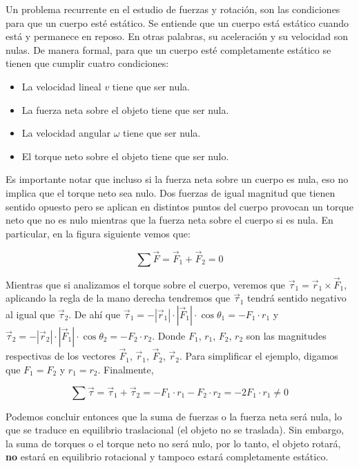 \documentclass[letterpaper]{article}
\begin{document}
Un problema recurrente en el estudio de fuerzas y rotación, son las condiciones para que un cuerpo esté estático. Se entiende que un cuerpo está estático cuando está y permanece en reposo. En otras palabras, su aceleración y su velocidad son nulas. De manera formal, para que un cuerpo esté completamente estático se tienen que cumplir cuatro condiciones:
\begin{itemize}
\item La velocidad lineal $v$ tiene que ser nula.
\item La fuerza neta sobre el objeto tiene que ser nula.
\item La velocidad angular $\omega$ tiene que ser nula.
\item El torque neto sobre el objeto tiene que ser nulo.
\end{itemize}

Es importante notar que incluso si la fuerza neta sobre un cuerpo es nula, eso no implica que el torque neto sea nulo. Dos fuerzas de igual magnitud que tienen sentido opuesto pero se aplican en distintos puntos del cuerpo provocan un torque neto que no es nulo mientras que la fuerza neta sobre el cuerpo si es nula. En particular, en la figura siguiente vemos que:

$$\sum\vec{F} = \vec{F}_1 + \vec{F}_2 = 0$$

Mientras que si analizamos el torque sobre el cuerpo, veremos que $\vec{\tau}_1 = \vec{r}_1\times\vec{F}_1$, aplicando la regla de la mano derecha tendremos que $\vec{\tau}_1$ tendrá sentido negativo al igual que $\vec{\tau}_2$. De ahí que $\vec{\tau}_1 = -|\vec{r}_1|\cdot|\vec{F}_1|\cdot\cos{\theta_1} = -F_1\cdot r_1$ y $\vec{\tau}_2 = -|\vec{r}_2|\cdot|\vec{F}_1|\cdot\cos{\theta_2} = -F_2\cdot r_2$. Donde $F_1$, $r_1$, $F_2$, $r_2$ son las magnitudes respectivas de los vectores $\vec{F}_1$, $\vec{r}_1$, $\vec{F}_2$, $\vec{r}_2$. Para simplificar el ejemplo, digamos que $F_1 = 
F_2$ y $r_1 = r_2$. Finalmente,

$$\sum\vec{\tau} = \vec{\tau}_1 + \vec{\tau}_2 = -F_1\cdot r_1 - F_2\cdot r_2 = -2F_1\cdot r_1 \neq 0$$

Podemos concluir entonces que la suma de fuerzas o la fuerza neta será nula, lo que se traduce en equilibrio traslacional (el objeto no se traslada). Sin embargo, la suma de torques o el torque neto no será nulo, por lo tanto, el objeto rotará, \textbf{no} estará en equilibrio rotacional y tampoco estará completamente estático.

\begin{figure}[h]
\centering
{}
\end{figure}
 
\end{document}
